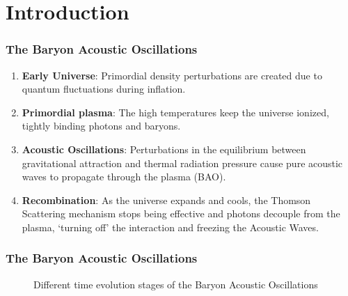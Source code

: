 \documentclass{beamer}
\begin{document}
\section{Introduction}
\begin{frame}[allowframebreaks]
\frametitle{The Baryon Acoustic Oscillations}

\begin{enumerate}
  \item \textbf{Early Universe}: Primordial density perturbations are created due to quantum fluctuations during inflation.
  
  \item \textbf{Primordial plasma}:  The high temperatures keep the universe ionized, tightly binding photons and baryons.
  
  \item \textbf{Acoustic Oscillations}: Perturbations in the equilibrium between gravitational attraction and thermal radiation pressure cause pure acoustic waves to propagate through the plasma (BAO).
  
  \item \textbf{Recombination}: As the universe expands and cools, the Thomson Scattering mechanism stops being effective and photons decouple from the plasma, `turning off' the interaction and freezing the Acoustic Waves.
  
  
\end{enumerate}

\end{frame}
\begin{frame}[allowframebreaks]
\frametitle{The Baryon Acoustic Oscillations}
\begin{figure}[b]
	\centering
	\caption{Different time evolution stages of the Baryon Acoustic Oscillations}
\end{figure}

\end{frame}
\end{document}
